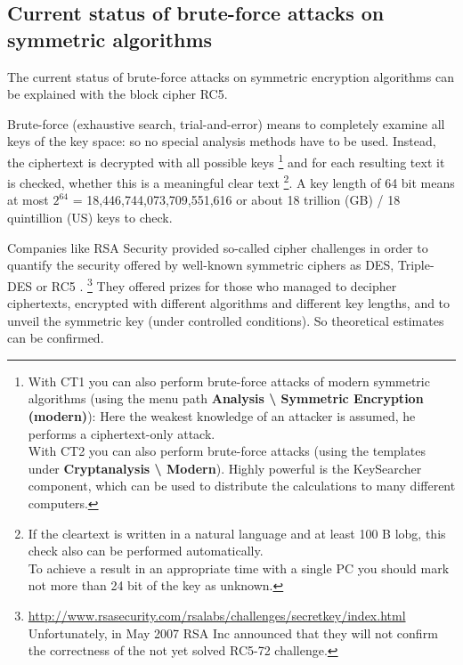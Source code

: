 \subsection{Current status of brute-force attacks on symmetric algorithms}
\label{Brute-force-gegen-Symmetr}

The current status of brute-force attacks on symmetric encryption algorithms can be explained with the block cipher RC5.

Brute-force (exhaustive search, trial-and-error) means to completely examine all keys of the key space: so no special analysis methods have to be used. Instead, the ciphertext is decrypted with all possible keys%
\footnote{%
    With CT1 you can also perform brute-force attacks
    of modern symmetric algorithms (using the menu path
    {\bf Analysis \textbackslash{} Symmetric Encryption (modern)}): Here
    the weakest knowledge of an attacker is assumed, he performs a 
    ciphertext-only attack.\\
    With CT2 you can also perform brute-force attacks
    (using the templates under {\bf Cryptanalysis \textbackslash{} Modern}).
    Highly powerful is the KeySearcher component, which can be used to
    distribute the calculations to many different computers.
}
and for each resulting text it is checked, whether this is a meaningful clear text%
\footnote{%
    If the cleartext is written in a natural language and at least 100 B
    lobg, this check also can be performed automatically.\\
    To achieve a result in an appropriate time with a single PC you should 
    mark not more than 24 bit of the key as unknown.
}.
A key length of 64 bit means at most $2^{64}$ = 18,446,744,073,709,551,616 or about 18 trillion (GB) / 18 quintillion (US)  keys to check.

Companies like RSA Security provided so-called cipher challenges in order
to quantify the security offered by well-known symmetric ciphers as DES,
Triple-DES or RC5%
.%
\footnote{%
 \url{http://www.rsasecurity.com/rsalabs/challenges/secretkey/index.html}\\
 Unfortunately, in May 2007 RSA Inc announced that they will not confirm the
 correctness of the not yet solved RC5-72 challenge.}
They offered prizes for those who managed to decipher ciphertexts, encrypted with different algorithms and different key lengths, and to unveil the symmetric key (under controlled conditions). So theoretical estimates can be confirmed.

